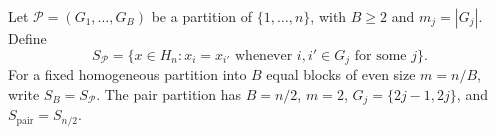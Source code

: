 Let \(\mathcal P=(G_1,\ldots,G_B)\) be a partition of \(\{1,\ldots,n\}\), with \(B\geq2\) and \(m_j=|G_j|\). Define
\[
S_{\mathcal P}=\{x\in H_n:x_i=x_{i'}\text{ whenever }i,i'\in G_j\text{ for some }j\}.
\]
For a fixed homogeneous partition into \(B\) equal blocks of even size \(m=n/B\), write \(S_B=S_{\mathcal P}\). The pair partition has \(B=n/2\), \(m=2\), \(G_j=\{2j-1,2j\}\), and \(S_{\mathrm{pair}}=S_{n/2}\).